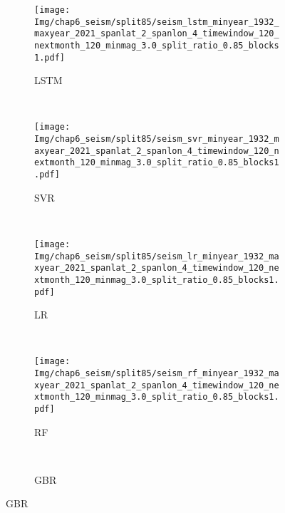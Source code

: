 \begin{figure}[!htbp]
  \vspace{-2cm}
  \centering
  \begin{subfigure}[b]{0.45\textwidth}
    \caption{LSTM}
    \texttt{[image: Img/chap6\_seism/split85/seism\_lstm\_minyear\_1932\_maxyear\_2021\_spanlat\_2\_spanlon\_4\_timewindow\_120\_nextmonth\_120\_minmag\_3.0\_split\_ratio\_0.85\_blocks1.pdf]}
    \vspace{-1cm}
    \label{fig:seism_lstm_minyear_1932_maxyear_2021_spanlat_2_spanlon_4_timewindow_120_nextmonth_120_minmag_3.0_split_ratio_0.85_blocks1}
  \end{subfigure}
  ~
  \begin{subfigure}[b]{0.45\textwidth}
    \caption{SVR} 
    \texttt{[image: Img/chap6\_seism/split85/seism\_svr\_minyear\_1932\_maxyear\_2021\_spanlat\_2\_spanlon\_4\_timewindow\_120\_nextmonth\_120\_minmag\_3.0\_split\_ratio\_0.85\_blocks1.pdf]}
    \vspace{-1cm}
    \label{fig:seism_svr_minyear_1932_maxyear_2021_spanlat_2_spanlon_4_timewindow_120_nextmonth_120_minmag_3.0_split_ratio_0.85_blocks1}
  \end{subfigure}   
  \\
  \begin{subfigure}[b]{0.45\textwidth}
      \caption{LR}
      \vspace{-0.2cm}
      \texttt{[image: Img/chap6\_seism/split85/seism\_lr\_minyear\_1932\_maxyear\_2021\_spanlat\_2\_spanlon\_4\_timewindow\_120\_nextmonth\_120\_minmag\_3.0\_split\_ratio\_0.85\_blocks1.pdf]}
      \vspace{-1cm}
      \label{fig:seism_lr_minyear_1932_maxyear_2021_spanlat_2_spanlon_4_timewindow_120_nextmonth_120_minmag_3.0_split_ratio_0.85_blocks1}
  \end{subfigure}
  ~
  \begin{subfigure}[b]{0.45\textwidth}
    \caption{RF}
    \vspace{-0.2cm}
    \texttt{[image: Img/chap6\_seism/split85/seism\_rf\_minyear\_1932\_maxyear\_2021\_spanlat\_2\_spanlon\_4\_timewindow\_120\_nextmonth\_120\_minmag\_3.0\_split\_ratio\_0.85\_blocks1.pdf]}
    \vspace{-1cm}
    \label{fig:seism_rf_minyear_1932_maxyear_2021_spanlat_2_spanlon_4_timewindow_120_nextmonth_120_minmag_3.0_split_ratio_0.85_blocks1}
  \end{subfigure}
  \\
  \begin{subfigure}[b]{0.45\textwidth}
    \caption{GBR}

\end{subfigure}
\end{figure}
